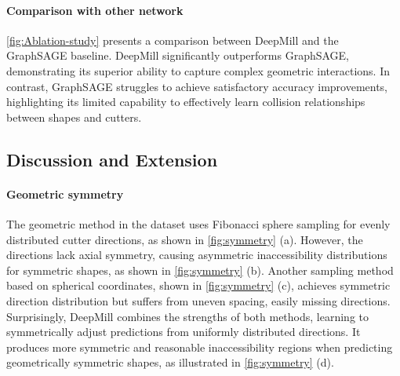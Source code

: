 \paragraph{Comparison with other network}
\autoref{fig:Ablation-study} presents a comparison between DeepMill and the GraphSAGE baseline. DeepMill significantly outperforms GraphSAGE, demonstrating its superior ability to capture complex geometric interactions. In contrast, GraphSAGE struggles to achieve satisfactory accuracy improvements, highlighting its limited capability to effectively learn collision relationships between shapes and cutters.

\subsection{Discussion and Extension}

\paragraph{Geometric symmetry}
The geometric method in the dataset uses Fibonacci sphere sampling for evenly distributed cutter directions, as shown in \autoref{fig:symmetry} (a). However, the directions lack axial symmetry, causing asymmetric inaccessibility distributions for symmetric shapes, as shown in \autoref{fig:symmetry} (b).
Another sampling method based on spherical coordinates, shown in \autoref{fig:symmetry} (c), achieves symmetric direction distribution but suffers from uneven spacing, easily missing directions.
Surprisingly, DeepMill combines the strengths of both methods, learning to symmetrically adjust predictions from uniformly distributed directions. It produces more symmetric and reasonable inaccessibility regions when predicting geometrically symmetric shapes, as illustrated in \autoref{fig:symmetry} (d).

